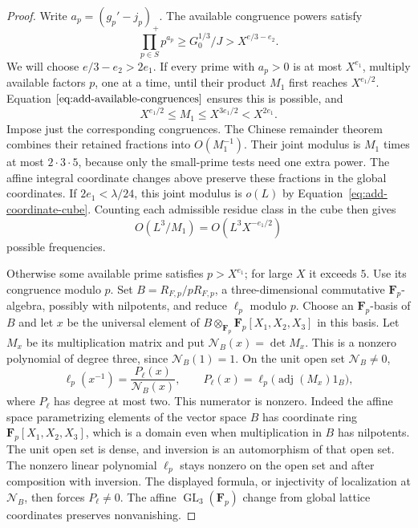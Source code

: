 \begin{proof}
Write \(a_p=(g_p'-j_p)_+\).  The available congruence powers satisfy
\begin{equation}
 \prod_{p\in S}p^{a_p}
   \ge G_0^{1/3}/J
   > X^{e/3-e_2}.
 \label{eq:add-available-congruences}
\end{equation}
We will choose \(e/3-e_2>2e_1\).  If every prime with \(a_p>0\) is at most
\(X^{e_1}\), multiply available factors \(p\), one at a time, until their
product \(M_1\) first reaches \(X^{e_1/2}\).  Equation
\(\eqref{eq:add-available-congruences}\) ensures this is possible, and
\[
 X^{e_1/2}\le M_1\le X^{3e_1/2}<X^{2e_1}.
\]
Impose just the corresponding congruences.  The Chinese remainder theorem
combines their retained fractions into \(O(M_1^{-1})\).  Their joint modulus
is \(M_1\) times at most \(2\cdot3\cdot5\), because only the small-prime
tests need one extra power.  The affine integral coordinate changes above
preserve these fractions in the global coordinates.  If
\(2e_1<\lambda/24\), this joint modulus is \(o(L)\) by
Equation~\eqref{eq:add-coordinate-cube}.  Counting each admissible residue
class in the cube then gives
\begin{equation}
 O(L^3/M_1)=O(L^3X^{-e_1/2})
 \label{eq:add-composite-congruence-count}
\end{equation}
possible frequencies.

Otherwise some available prime satisfies \(p>X^{e_1}\); for large \(X\)
it exceeds \(5\).  Use its congruence modulo \(p\).  Set
\(B=R_{F,p}/pR_{F,p}\), a three-dimensional commutative \(\mathbf F_p\)-algebra,
possibly with nilpotents, and reduce \(\ell_p\) modulo \(p\).  Choose an
\(\mathbf F_p\)-basis of \(B\) and let \(x\) be the universal element of
\(B\otimes_{\mathbf F_p}\mathbf F_p[X_1,X_2,X_3]\) in this basis.
Let \(M_x\) be its multiplication matrix and put
\(\mathcal N_B(x)=\det M_x\).  This is a nonzero polynomial of degree three,
since \(\mathcal N_B(1)=1\).  On the unit open set \(\mathcal N_B\ne0\),
\[
 \ell_p(x^{-1})=\frac{P_\ell(x)}{\mathcal N_B(x)},\qquad
 P_\ell(x)=\ell_p\bigl(\operatorname{adj}(M_x)1_B\bigr),
\]
where \(P_\ell\) has degree at most two.  This numerator is nonzero.
Indeed the affine space parametrizing elements of the vector space \(B\)
has coordinate ring \(\mathbf F_p[X_1,X_2,X_3]\), which is a domain even
when multiplication in \(B\) has nilpotents.  The unit open set is dense,
and inversion is an automorphism of that open set.  The nonzero linear
polynomial \(\ell_p\) stays nonzero on the open set and after composition
with inversion.  The displayed formula, or injectivity of localization at
\(\mathcal N_B\), then forces \(P_\ell\ne0\).
The affine \(\operatorname{GL}_3(\mathbf F_p)\) change from global lattice
coordinates preserves nonvanishing.


\end{proof}
